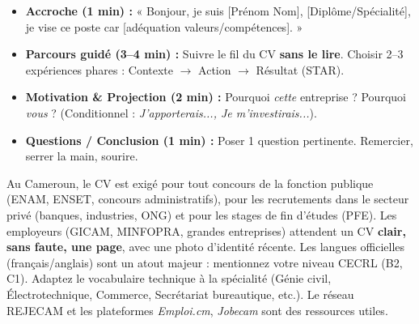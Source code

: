 \documentclass[11pt]{article}
\newcommand{\cle}[1]{{\popxbold\color{popdark}#1}}
\begin{document}
\begin{methode}
\begin{itemize}
    \item \textbf{Accroche (1 min) :} « Bonjour, je suis [Prénom Nom], [Diplôme/Spécialité], je vise ce poste car [adéquation valeurs/compétences]. »
    \item \textbf{Parcours guidé (3--4 min) :} Suivre le fil du CV \textbf{sans le lire}. Choisir 2--3 expériences phares : \cle{Contexte $\to$ Action $\to$ Résultat (STAR)}.
    \item \textbf{Motivation \& Projection (2 min) :} Pourquoi \emph{cette} entreprise ? Pourquoi \emph{vous} ? (Conditionnel : \textit{J'apporterais..., Je m'investirais...}).
    \item \textbf{Questions / Conclusion (1 min) :} Poser 1 question pertinente. Remercier, serrer la main, sourire.
\end{itemize}
\end{methode}

\begin{savaistu}
Au Cameroun, le CV est exigé pour tout concours de la fonction publique (ENAM, ENSET, concours administratifs), pour les recrutements dans le secteur privé (banques, industries, ONG) et pour les stages de fin d'études (PFE). Les employeurs (GICAM, MINFOPRA, grandes entreprises) attendent un CV \textbf{clair, sans faute, une page}, avec une photo d'identité récente. Les langues officielles (français/anglais) sont un atout majeur : mentionnez votre niveau \cle{CECRL} (B2, C1). Adaptez le vocabulaire technique à la spécialité (Génie civil, Électrotechnique, Commerce, Secrétariat bureautique, etc.). Le réseau \cle{REJECAM} et les plateformes \textit{Emploi.cm}, \textit{Jobecam} sont des ressources utiles.
\end{savaistu}
\end{document}
